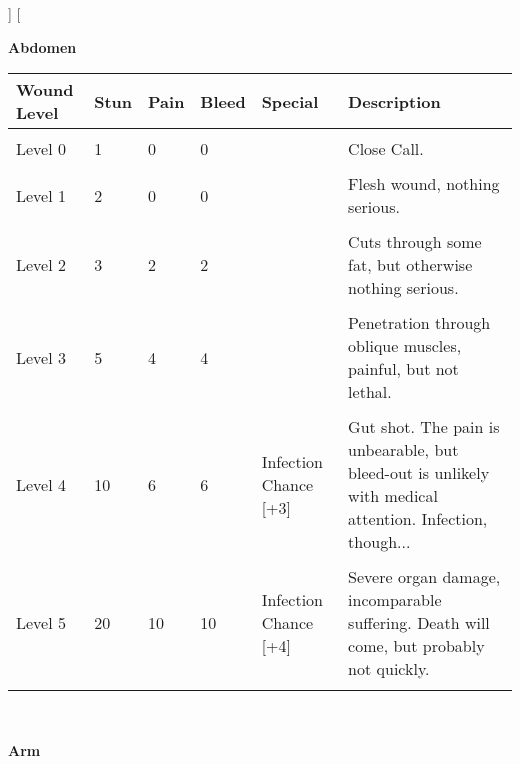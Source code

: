 \documentclass[a4paper, twocolumn, openany]{book}
\begin{document}
{{}]
\twocolumn[{

{\bfseries Abdomen\\}

{\centering
\begin{tabular}{llllp{3cm}p{7cm}}
Wound Level 	& Stun 	& Pain 	& Bleed 	& Special 											& Description \\ \hline \\
Level 0 		& 1 	& 0 	& 0 		&													& Close Call. \\ \\
Level 1 		& 2 	& 0 	& 0 		&													& Flesh wound, nothing serious. \\ \\
Level 2 		& 3 	& 2 	& 2 		& 													& Cuts through some fat, but otherwise nothing serious. \\ \\
Level 3 		& 5 	& 4 	& 4 		& 													& Penetration through oblique muscles, painful, but not lethal. \\ \\
Level 4 		& 10 	& 6 	& 6 		& Infection Chance [+3]								& Gut shot. The pain is unbearable, but bleed-out is unlikely with medical attention. Infection, though... \\ \\
Level 5 		& 20 	& 10 	& 10 		& Infection Chance [+4]								& Severe organ damage, incomparable suffering. Death will come, but probably not quickly. \\ 
\\ \hline
\end{tabular}\\[\baselineskip] }

{\bfseries Arm\\}

}}
\end{document}
